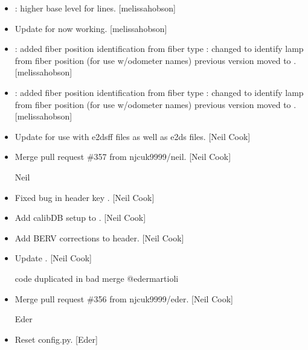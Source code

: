 \documentclass[a4paper,10pt,english]{report}
\begin{document}
\begin{itemize}
\item {} 
: higher base level for lines. {[}melissa\sphinxhyphen{}hobson{]}

\item {} 
Update for  \sphinxhyphen{} now working. {[}melissa\sphinxhyphen{}hobson{]}

\item {} 
: added fiber position identification from fiber
type : \sphinxhyphen{} changed to identify lamp from
fiber position (for use w/odometer names) \sphinxhyphen{} previous version moved to
. {[}melissa\sphinxhyphen{}hobson{]}

\item {} 
: added fiber position identification from fiber
type : \sphinxhyphen{} changed to identify lamp from
fiber position (for use w/odometer names) \sphinxhyphen{} previous version moved to
. {[}melissa\sphinxhyphen{}hobson{]}

\item {} 
Update for use with e2dsff files as well as e2ds files. {[}Neil Cook{]}

\item {} 
Merge pull request \#357 from njcuk9999/neil. {[}Neil Cook{]}

Neil

\item {} 
Fixed bug in header key . {[}Neil Cook{]}

\item {} 
Add calibDB setup to . {[}Neil Cook{]}

\item {} 
Add BERV corrections to header. {[}Neil Cook{]}

\item {} 
Update . {[}Neil Cook{]}

code duplicated in bad merge @edermartioli

\item {} 
Merge pull request \#356 from njcuk9999/eder. {[}Neil Cook{]}

Eder

\item {} 
Reset config.py. {[}Eder{]}


\end{itemize}
\end{document}
